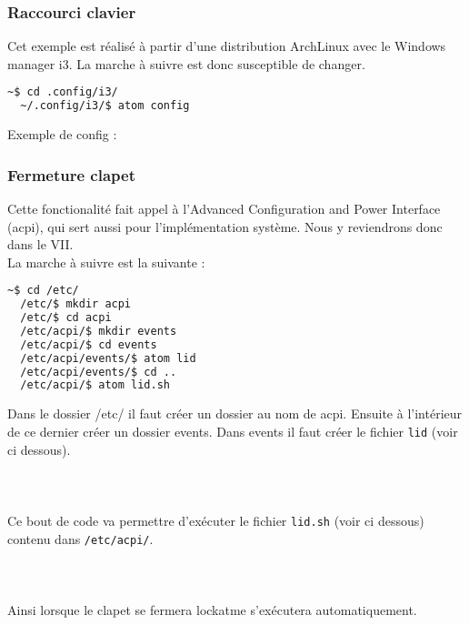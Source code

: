     \subsubsection{Raccourci clavier}
Cet exemple est réalisé à partir d'une distribution ArchLinux avec le Windows
manager i3. La marche à suivre est donc susceptible de changer.
\begin{lstlisting}[language=bash]
  ~$ cd .config/i3/
  ~/.config/i3/$ atom config
\end{lstlisting}
Exemple de config :

\newpage

    \subsubsection{Fermeture clapet}
Cette fonctionalité fait appel à l'Advanced Configuration and Power Interface
(acpi), qui sert aussi pour l'implémentation système. Nous y reviendrons donc
dans le VII.\\
La marche à suivre est la suivante :
\begin{lstlisting}[language=bash]
  ~$ cd /etc/
  /etc/$ mkdir acpi
  /etc/$ cd acpi
  /etc/acpi/$ mkdir events
  /etc/acpi/$ cd events
  /etc/acpi/events/$ atom lid
  /etc/acpi/events/$ cd ..
  /etc/acpi/$ atom lid.sh
\end{lstlisting}
Dans le dossier /etc/ il faut créer un dossier au nom de acpi. Ensuite à
l'intérieur de ce dernier créer un dossier events. Dans events il faut créer le
fichier \verb|lid| (voir ci dessous).\\
\\
\\
\\
Ce bout de code va permettre d'exécuter le fichier \verb|lid.sh| (voir ci dessous)
contenu dans \verb|/etc/acpi/|.\\
\\
\\
\\
Ainsi lorsque le clapet se fermera lockatme s'exécutera automatiquement.
\newpage

